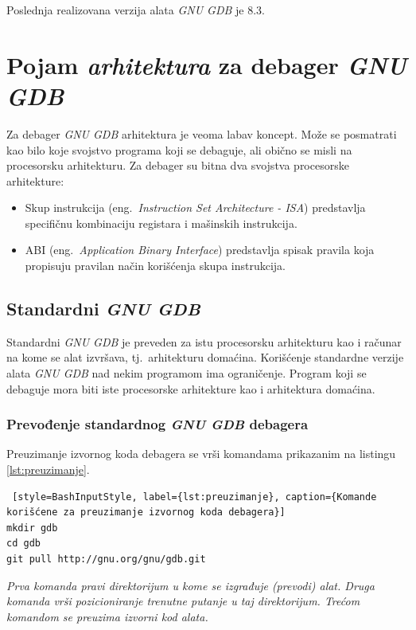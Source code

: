 \documentclass[12pt,oneside]{memoir}
\begin{document}
Poslednja realizovana verzija alata \emph{GNU GDB} je 8.3.

\section{Pojam \emph{arhitektura} za debager \emph{GNU GDB}}

Za debager \emph{GNU GDB} arhitektura je veoma labav koncept. Može se posmatrati kao bilo koje svojstvo programa koji se debaguje, ali obično se misli na procesorsku arhitekturu. Za debager su bitna dva svojstva procesorske arhitekture:

\begin{itemize}
	\item Skup instrukcija (eng.~\emph{Instruction Set Architecture - ISA}) predstavlja specifičnu kombinaciju registara i mašinskih instrukcija.
	\item ABI (eng.~\emph{Application Binary Interface}) predstavlja spisak pravila koja propisuju pravilan način korišćenja skupa instrukcija.
\end{itemize}

\subsection{Standardni \emph{GNU GDB}}

Standardni \emph{GNU GDB} je preveden za istu procesorsku arhitekturu kao i računar na kome se alat izvršava, tj.~arhitekturu domaćina. Korišćenje standardne verzije alata \emph{GNU GDB} nad nekim programom ima ograničenje. Program koji se debaguje mora biti iste procesorske arhitekture kao i arhitektura domaćina.

\subsubsection{Prevođenje standardnog \emph{GNU GDB} debagera}

Preuzimanje izvornog koda debagera se vrši komandama prikazanim na listingu \ref{lst:preuzimanje}.
\begin{lstlisting} [style=BashInputStyle, label={lst:preuzimanje}, caption={Komande korišćene za preuzimanje izvornog koda debagera}]
mkdir gdb
cd gdb
git pull http://gnu.org/gnu/gdb.git

\end{lstlisting}

\emph{ Prva komanda pravi direktorijum u kome se izgrađuje (prevodi) alat. Druga komanda vrši pozicioniranje trenutne putanje u taj direktorijum. Trećom komandom se preuzima izvorni kod alata.}\newpage
\end{document}
